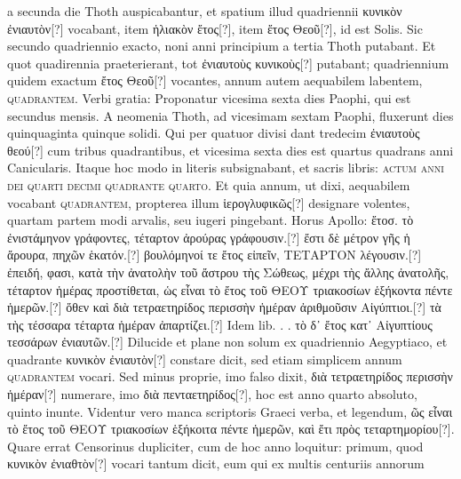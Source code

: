 a secunda die Thoth auspicabantur, et spatium illud quadriennii
\textgreek{κυνικὸν ἐνιαυτὸν}[?] vocabant, item \textgreek{ἡλιακὸν ἔτος}[?],
 item \textgreek{ἔτος Θεοῦ}[?], id
est Solis.
Sic secundo quadriennio exacto, noni anni principium a
tertia Thoth putabant.
Et quot quadirennia praeterierant, tot \textgreek{ἐνιαυτοὺς
κυνικοὺς}[?] putabant; quadriennium quidem exactum
 \textgreek{ἔτος Θεοῦ}[?] vocantes,
annum autem aequabilem labentem, \textsc{quadrantem}.
Verbi
gratia: Proponatur vicesima sexta dies Paophi, qui est secundus
mensis.
%
A neomenia Thoth, ad vicesimam sextam Paophi, fluxerunt
dies quinquaginta quinque solidi.
Qui per quatuor divisi
dant tredecim \textgreek{ἐνιαυτοὺς θεού}[?] cum tribus quadrantibus, et vicesima
sexta dies est quartus quadrans anni  Canicularis.
Itaque hoc
modo in literis subsignabant, et sacris libris: \textsc{actum anni
dei quarti decimi quadrante quarto}.
Et quia
annum, ut dixi, aequabilem vocabant \textsc{quadrantem}, propterea
illum \textgreek{ἱερογλυφικῶς}[?] designare volentes,
 quartam partem modi arvalis,
seu iugeri pingebant.
Horus Apollo: \textgreek{ἔτοσ. τὸ ἐνιστάμηνον γράφοντες,
τέταρτον ἀρούρας γράφουσιν.}[?]
\textgreek{ἔστι δὲ μέτρον γῆς ἡ ἄρουρα, πηχῶν
ἑκατόν.}[?]
\textgreek{βουλόμηνοί τε ἔτος εἰπεῖν, ΤΕΤΑΡΤΟΝ λέγουσιν.}[?]
\textgreek{ἐπειδή,
φασι, κατὰ τὴν ἀνατολὴν τοῦ ἄστρου τὴς Σώθεως, μέχρι τὴς ἄλλης ἀνατολῆς,
τέταρτον ἡμέρας προστίθεται, ὡς εἶναι τὸ ἔτος τοῦ ΘΕΟΥ τριακοσίων
ἑξήκοντα πέντε ἡμερῶν.}[?]
\textgreek{ὅθεν καὶ διὰ τετραετηρίδος περισσὴν ἡμέραν ἀριθμοῦσιν
Αἰγύπτιοι.}[?]
\textgreek{τὰ τὴς τέσσαρα τέταρτα ἡμέραν ἀπαρτίζει.}[?]
Idem lib.
. .
\textgreek{τὸ δ᾽ ἔτος κατ᾽ Αἰγυπτίους τεσσάρων ἐνιαυτῶν.}[?]
Dilucide et
plane non solum ex quadriennio Aegyptiaco, et quadrante \textgreek{κυνικὸν
ἐνιαυτὸν}[?] constare dicit, sed etiam simplicem annum \textsc{quadrantem}
vocari.
Sed minus proprie, imo falso dixit, \textgreek{διὰ
τετραετηρίδος περισσὴν ἡμέραν}[?] numerare, imo \textgreek{διὰ πενταετηρίδος}[?], hoc
est anno quarto absoluto, quinto inunte.
Videntur vero manca scriptoris
Graeci verba, et legendum, \textgreek{ῶς εἶναι τὸ ἔτος τοῦ ΘΕΟΥ τριακοσίων
ἑξήκοιτα πέντε ἡμερῶν, καὶ ἔτι πρὸς τεταρτημορίου}[?].
Quare errat Censorinus
dupliciter, cum de hoc anno loquitur: primum, quod \textgreek{κυνικὸν
ἐνιαθτὸν}[?] vocari tantum dicit, eum qui ex multis centuriis annorum
